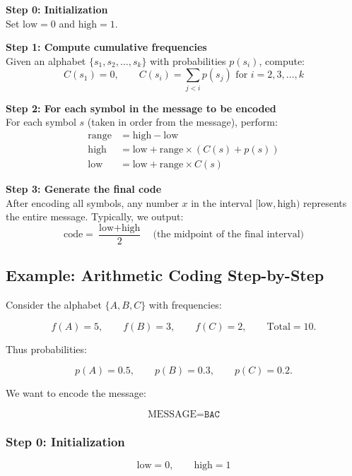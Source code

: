 \documentclass[12pt]{article}
\begin{document}
\begin{tcolorbox}[colback=blue!3,colframe=blue!40!black,title=Algorithm: Arithmetic Coding Encoding]
\textbf{Step 0: Initialization} \\
Set $\text{low} = 0$ and $\text{high} = 1$.

\vspace{2mm}
\textbf{Step 1: Compute cumulative frequencies} \\
Given an alphabet $\{s_1, s_2, \dots, s_k\}$ with probabilities $p(s_i)$, compute:
\[
C(s_1) = 0, \qquad C(s_i) = \sum_{j < i} p(s_j) \text{ for } i = 2, 3, \dots, k
\]

\vspace{2mm}
\textbf{Step 2: For each symbol in the message to be encoded} \\
For each symbol $s$ (taken in order from the message), perform:
\begin{align*}
\text{range} &= \text{high} - \text{low} \\
\text{high} &= \text{low} + \text{range} \times (C(s) + p(s)) \\
\text{low} &= \text{low} + \text{range} \times C(s)
\end{align*}

\vspace{2mm}
\textbf{Step 3: Generate the final code} \\
After encoding all symbols, any number $x$ in the interval $[\text{low}, \text{high})$ represents the entire message. Typically, we output:
\[
\text{code} = \frac{\text{low} + \text{high}}{2} \quad \text{(the midpoint of the final interval)}
\]
\end{tcolorbox}

\subsection{Example: Arithmetic Coding Step-by-Step}

Consider the alphabet $\{A,B,C\}$ with frequencies:

\[
f(A)=5,\qquad f(B)=3,\qquad f(C)=2,\qquad \text{Total}=10.
\]

Thus probabilities:

\[
p(A)=0.5,\qquad p(B)=0.3,\qquad p(C)=0.2.
\]

We want to encode the message:

\[
\text{MESSAGE} = \texttt{BAC}
\]

\subsubsection*{Step 0: Initialization}
\[
\text{low} = 0,\qquad \text{high} = 1
\]
\end{document}
